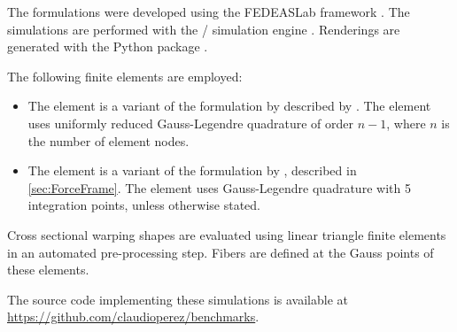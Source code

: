 The formulations were developed using the FEDEASLab framework \citep{filippou2004fedeaslabb}. 
The simulations are performed with the \Xara{}/\OpenSees{} simulation engine \citep{perez2024xara}. 
Renderings are generated with the \Veux{} Python package \citep{perez2023veux}.

The following finite elements are employed:
\begin{itemize}
\item The \ExactFrame{} element is a variant of the formulation by \cite{simo1986threedimensional} described by \cite{perez2024nonlinear}. 
  The element uses uniformly reduced Gauss-Legendre quadrature of order \(n-1\), where $n$ is the number of element nodes. 
\item The \ForceFrame{} element is a variant of the formulation by \cite{taylor2003mixed}, described in \cref{sec:ForceFrame}. 
  The element uses Gauss-Legendre quadrature with 5 integration points, unless otherwise stated. 
\end{itemize}

Cross sectional warping shapes are evaluated using linear triangle finite elements in an automated pre-processing step. 
Fibers are defined at the Gauss points of these elements.

The source code implementing these simulations is available at \url{https://github.com/claudioperez/benchmarks}.

% 


% 


